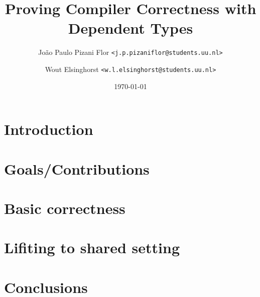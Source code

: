\documentclass[a4paper]{article}
\title{Proving Compiler Correctness with Dependent Types}
\date{\today}
\author {
    João Paulo Pizani Flor \texttt{<j.p.pizaniflor@students.uu.nl>} \\
    \and Wout Elsinghorst \texttt{<w.l.elsinghorst@students.uu.nl>} \\
}
\begin{document}
    \maketitle

    \section{Introduction}
    \label{sec:intro}

    \section{Goals/Contributions}
    \label{sec:goals}

    \section{Basic correctness}
    \label{sec:basic}

    \section{Lifiting to shared setting}
    \label{sec:lifiting}

           

    \section{Conclusions}
    \label{sec:conclusions}





\end{document}
